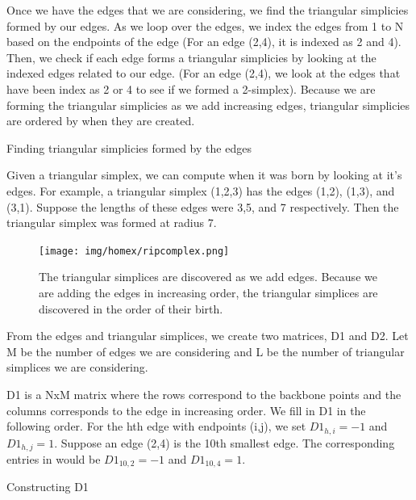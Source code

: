 \documentclass[12pt, a4paper, twocolumn, fullpage]{article}
\theoremstyle{plain}
\theoremstyle{definition}
\theoremstyle{remark}
\begin{document}
Once we have the edges that we are considering, we find the triangular simplicies formed by our edges. As we loop over the edges, we index the edges from 1 to N based on the endpoints of the edge (For an edge (2,4),   it is indexed as 2 and 4). Then, we check if each edge forms a triangular simplicies by looking at the indexed edges related to our edge. (For an edge (2,4), we look at the edges that have been index as 2 or 4 to see if we formed a 2-simplex). Because we are forming the triangular simplicies as we add increasing edges, triangular simplicies are ordered by when they are created. 

\begin{algorithm}
\caption{Finding triangular simplicies formed by the edges}
\begin{algorithmic}
    \ENDFOR
\ENDFOR
\end{algorithmic}
\end{algorithm}

Given a triangular simplex, we can compute when it was born by looking at it's edges. For example, a triangular simplex (1,2,3) has the edges (1,2), (1,3), and (3,1). Suppose the lengths of these edges were 3,5, and 7 respectively. Then the triangular simplex was formed at radius 7. 

\begin{figure}
    \texttt{[image: img/homex/ripcomplex.png]}
    \caption{The triangular simplices are discovered as we add edges. Because we are adding the edges in increasing order, the triangular simplices are discovered in the order of their birth.}
    \label{Simplex formation algorithm}
\end{figure}

From the edges and triangular simplices, we create two matrices, D1 and D2. Let M be the number of edges we are considering and L be the number of triangular simplices we are considering.

D1 is a  NxM matrix where the rows correspond to the backbone points and the columns corresponds to the edge in increasing order. We fill in D1 in the following order. For the hth  edge with endpoints (i,j), we set $D1_{h,i} = -1$ and $D1_{h,j} = 1$. Suppose an edge (2,4) is the 10th smallest edge. The corresponding entries in would be $D1_{10,2}=-1$ and $D1_{10,4}=1$.

\begin{algorithm}
\caption{Constructing D1}
\begin{algorithmic}
\ENDFOR
\end{algorithmic}
\end{algorithm}
\end{document}
